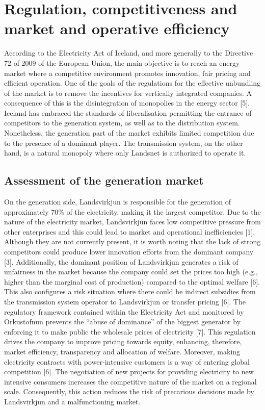 \documentclass[svn, final]{rureport}
\begin{document}

\section{Regulation, competitiveness and market and operative efficiency}

According to the Electricity Act of Iceland, and more generally to the Directive 72 of 2009 of the European Union, the main objective is to reach an energy market where a competitive environment promotes innovation, fair pricing and efficient operation. One of the goals of the regulations for the effective unbundling of the market is to remove the incentives for vertically integrated companies. A consequence of this is the disintegration of monopolies in the energy sector [5]. Iceland has embraced the standards of liberalisation permitting the entrance of competitors to the generation system, as well as to the distribution system. Nonetheless, the generation part of the market exhibits limited competition due to the presence of a dominant player. The transmission system, on the other hand, is a natural monopoly where only Landsnet is authorized to operate it.

\subsection{Assessment of the generation market}

On the generation side, Landsvirkjun is responsible for the generation of approximately 70\% of the electricity, making it the largest competitor. Due to the nature of the electricity market, Landsvirkjun faces low competitive pressure from other enterprises and this could lead to market and operational inefficiencies [1]. Although they are not currently present, it is worth noting that the lack of strong competitors could produce lower innovation efforts from the dominant company [3].  Additionally, the dominant position of Landsvirkjun generates a risk of unfairness in the market because the company could set the prices too high (e.g., higher than the marginal cost of production) compared to the optimal welfare [6]. This also configures a risk situation where there could be indirect subsidies from the transmission system operator to Landsvirkjun or transfer pricing [6].   
The regulatory framework contained within the Electricity Act and monitored by Orkustofnun prevents the “abuse of dominance” of the biggest generator by enforcing it to make public the wholesale prices of electricity [7]. This regulation drives the company to improve pricing towards equity, enhancing, therefore, market efficiency, transparency and allocation of welfare. Moreover, making electricity contracts with power-intensive customers is a way of entering global competition [6]. The negotiation of new projects for providing electricity to new intensive consumers increases the competitive nature of the market on a regional scale. Consequently, this action reduces the risk of precarious decisions made by Landsvirkjun and a malfunctioning market. 
\end{document}
